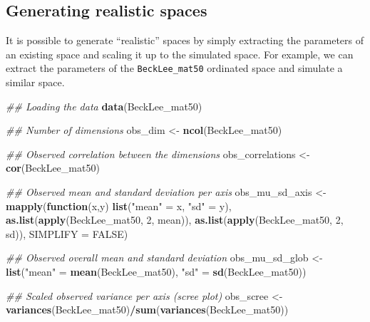 \documentclass[
]{book}
\newenvironment{Shaded}{\begin{snugshade}}{\end{snugshade}}
\newcommand{\CommentTok}[1]{\textcolor[rgb]{0.56,0.35,0.01}{\textit{#1}}}
\newcommand{\ControlFlowTok}[1]{\textcolor[rgb]{0.13,0.29,0.53}{\textbf{#1}}}
\newcommand{\DataTypeTok}[1]{\textcolor[rgb]{0.13,0.29,0.53}{#1}}
\newcommand{\DecValTok}[1]{\textcolor[rgb]{0.00,0.00,0.81}{#1}}
\newcommand{\KeywordTok}[1]{\textcolor[rgb]{0.13,0.29,0.53}{\textbf{#1}}}
\newcommand{\NormalTok}[1]{#1}
\newcommand{\OperatorTok}[1]{\textcolor[rgb]{0.81,0.36,0.00}{\textbf{#1}}}
\newcommand{\OtherTok}[1]{\textcolor[rgb]{0.56,0.35,0.01}{#1}}
\newcommand{\StringTok}[1]{\textcolor[rgb]{0.31,0.60,0.02}{#1}}
\begin{document}
\hypertarget{generating-realistic-spaces}{%
\subsection{Generating realistic spaces}\label{generating-realistic-spaces}}

It is possible to generate ``realistic'' spaces by simply extracting the parameters of an existing space and scaling it up to the simulated space.
For example, we can extract the parameters of the \texttt{BeckLee\_mat50} ordinated space and simulate a similar space.

\begin{Shaded}
\begin{Highlighting}[]
\CommentTok{\#\# Loading the data}
\KeywordTok{data}\NormalTok{(BeckLee\_mat50)}

\CommentTok{\#\# Number of dimensions}
\NormalTok{obs\_dim \textless{}{-}}\StringTok{ }\KeywordTok{ncol}\NormalTok{(BeckLee\_mat50)}

\CommentTok{\#\# Observed correlation between the dimensions}
\NormalTok{obs\_correlations \textless{}{-}}\StringTok{ }\KeywordTok{cor}\NormalTok{(BeckLee\_mat50)}

\CommentTok{\#\# Observed mean and standard deviation per axis}
\NormalTok{obs\_mu\_sd\_axis \textless{}{-}}\StringTok{ }\KeywordTok{mapply}\NormalTok{(}\ControlFlowTok{function}\NormalTok{(x,y) }\KeywordTok{list}\NormalTok{(}\StringTok{"mean"}\NormalTok{ =}\StringTok{ }\NormalTok{x, }\StringTok{"sd"}\NormalTok{ =}\StringTok{ }\NormalTok{y),}
                         \KeywordTok{as.list}\NormalTok{(}\KeywordTok{apply}\NormalTok{(BeckLee\_mat50, }\DecValTok{2}\NormalTok{, mean)),}
                         \KeywordTok{as.list}\NormalTok{(}\KeywordTok{apply}\NormalTok{(BeckLee\_mat50, }\DecValTok{2}\NormalTok{, sd)), }\DataTypeTok{SIMPLIFY =} \OtherTok{FALSE}\NormalTok{)}

\CommentTok{\#\# Observed overall mean and standard deviation}
\NormalTok{obs\_mu\_sd\_glob \textless{}{-}}\StringTok{ }\KeywordTok{list}\NormalTok{(}\StringTok{"mean"}\NormalTok{ =}\StringTok{ }\KeywordTok{mean}\NormalTok{(BeckLee\_mat50), }\StringTok{"sd"}\NormalTok{ =}\StringTok{ }\KeywordTok{sd}\NormalTok{(BeckLee\_mat50))}

\CommentTok{\#\# Scaled observed variance per axis (scree plot)}
\NormalTok{obs\_scree \textless{}{-}}\StringTok{ }\KeywordTok{variances}\NormalTok{(BeckLee\_mat50)}\OperatorTok{/}\KeywordTok{sum}\NormalTok{(}\KeywordTok{variances}\NormalTok{(BeckLee\_mat50))}


\end{Highlighting}
\end{Shaded}
\end{document}
